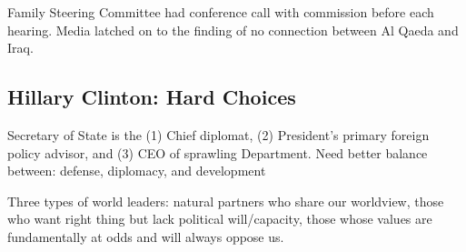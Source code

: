 \documentclass[
]{article}
\begin{document}
Family Steering Committee had conference call with commission before
each hearing. Media latched on to the finding of no connection between
Al Qaeda and Iraq.

\hypertarget{hillary-clinton-hard-choices}{%
\subsection{Hillary Clinton: Hard
Choices}\label{hillary-clinton-hard-choices}}

Secretary of State is the (1) Chief diplomat, (2) President's primary
foreign policy advisor, and (3) CEO of sprawling Department. Need better
balance between: defense, diplomacy, and development

Three types of world leaders: natural partners who share our worldview,
those who want right thing but lack political will/capacity, those whose
values are fundamentally at odds and will always oppose us.
\end{document}
